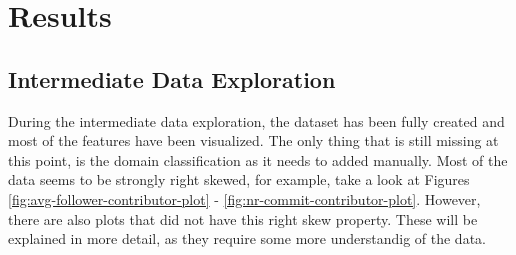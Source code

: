 \section{Results}
    \subsection{Intermediate Data Exploration}
        During the intermediate data exploration, the dataset has been fully created and most of the features have been visualized. 
        The only thing that is still missing at this point, is the domain classification as it needs to added manually.
        Most of the data seems to be strongly right skewed, for example, take a look at Figures \ref{fig:avg-follower-contributor-plot} - \ref{fig:nr-commit-contributor-plot}.
        However, there are also plots that did not have this right skew property.
        These will be explained in more detail, as they require some more understandig of the data.
        
